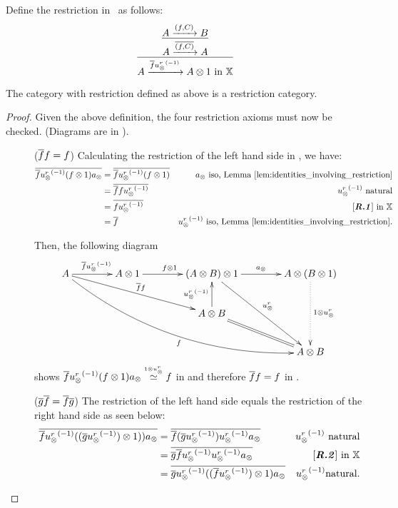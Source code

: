 Define the restriction in \Xt\ as follows:
\[
  \infer{A\xrightarrow{\restr{f}  \inv{u_{\*}^r}} A\*1 \text{ in }\X}
        {\infer{A\xrightarrow{\restr{(f,C)}}A}
               {A\xrightarrow{(f,C)}B}
        }
\]

\begin{lemma}\label{lem:xt_is_a_restriction_category}
  The category \Xt with restriction defined as above is a restriction category.
\end{lemma}
\begin{proof}

  Given the above definition, the four restriction axioms must now be checked. (Diagrams are in \X).
  \begin{description}
    \item[\rone] ($\overline{f} f = f$) Calculating the restriction of the left hand side in
      \X, we have:
      \begin{align*}
        \restr{\rst{f}\inv{\usr} (f\*1) a_{\*}} & = \restr{\rst{f}\inv{\usr} (f\*1)}  
          & a_{\*}   \text{ iso, Lemma \ref{lem:identities_involving_restriction}}\\
        & = \restr{\rst{f}f \inv{\usr}}  & \inv{\usr} \text{ natural}\\
        & = \restr{f \inv{\usr}}  & \text{ \rone in }\X\\
        & = \restr{f } & \inv{\usr}   \text{ iso, Lemma \ref{lem:identities_involving_restriction}}.
      \end{align*}

      Then, the following diagram
      \[
        \xymatrix @C=40pt @R=25pt{
          A \ar[r]^{\restr{f} \inv{\usr}}
          \ar @/_25pt/[ddrrr]_f  \ar[drr]^{\restr{f}f}
          &A \* 1 \ar[r]^{f\* 1}
          &(A \* B) \* 1 \ar[r]^{a_{\*}} \ar[ddr]^{\usr}
          &A \* (B \* 1) \ar@{.>}[dd]^{1 \* {\usr}}\\
          &&A\*B \ar[u]^{\inv{\usr}} \ar@{=} [dr]\\
          && &A \* B
        }
      \]
      shows $\overline{f}{u_{\otimes}^r}^{(-1)} (f\otimes1) a_{\otimes} \overset{\scriptscriptstyle 1 \otimes {\ensuremath{u_{\otimes}^r}}}{\simeq} f$ in \X and therefore $\overline{f}f
      = f$ in \Xt.


    \item[\rtwo] ($\overline{g} \overline{f} = \overline{f} \overline{g}$) The restriction of the left hand
      side equals the restriction of the right hand side as seen below:
      \begin{align*}
        \restr{\rst{f}\inv{\usr} ((\restr{g}\inv\usr)\*1)) a_{\*}} & = \restr{\rst{f}(\restr{g}\inv\usr)\inv{\usr} a_{\*}} & \inv{\usr}   \text{ natural}\\
        & = \restr{\rst{g}\restr{f}\inv\usr\inv{\usr} a_{\*}} &  \text{\rtwo in }\X\\
        & = \restr{\rst{g}\inv{\usr}((\restr{f}\inv\usr)\*1) a_{\*}} & \inv{\usr}   \text{natural}.
      \end{align*}


\end{description}
\end{proof}
